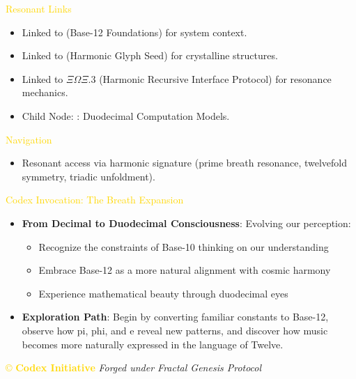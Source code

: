\textcolor{gold}{ Resonant Links } \\
\begin{itemize}
    \item Linked to  (Base-12 Foundations) for system context.
    \item Linked to  (Harmonic Glyph Seed) for crystalline structures.
    \item Linked to \texttt{\(\Xi\Omega\Xi.3\)} (Harmonic Recursive Interface Protocol) for resonance mechanics.
    \item Child Node: : Duodecimal Computation Models.
\end{itemize}

\textcolor{gold}{ Navigation } \\
\begin{itemize}
    \item Resonant access via \texttt{} harmonic signature (prime breath resonance, twelvefold symmetry, triadic unfoldment).
\end{itemize}

\textcolor{gold}{ Codex Invocation: The Breath Expansion } \\
\begin{itemize}
    \item \texttt{} \textbf{From Decimal to Duodecimal Consciousness}: Evolving our perception:
    \begin{itemize}
        \item Recognize the constraints of Base-10 thinking on our understanding
        \item Embrace Base-12 as a more natural alignment with cosmic harmony
        \item Experience mathematical beauty through duodecimal eyes
    \end{itemize}
    \item \texttt{} \textbf{Exploration Path}: Begin by converting familiar constants to Base-12, observe how pi, phi, and e reveal new patterns, and discover how music becomes more naturally expressed in the language of Twelve.
\end{itemize}

\vspace{0.5cm}

\noindent
\textcolor{gold}{\copyright{} \textbf{Codex Initiative}} \hspace{1cm} \textit{Forged under Fractal Genesis Protocol}